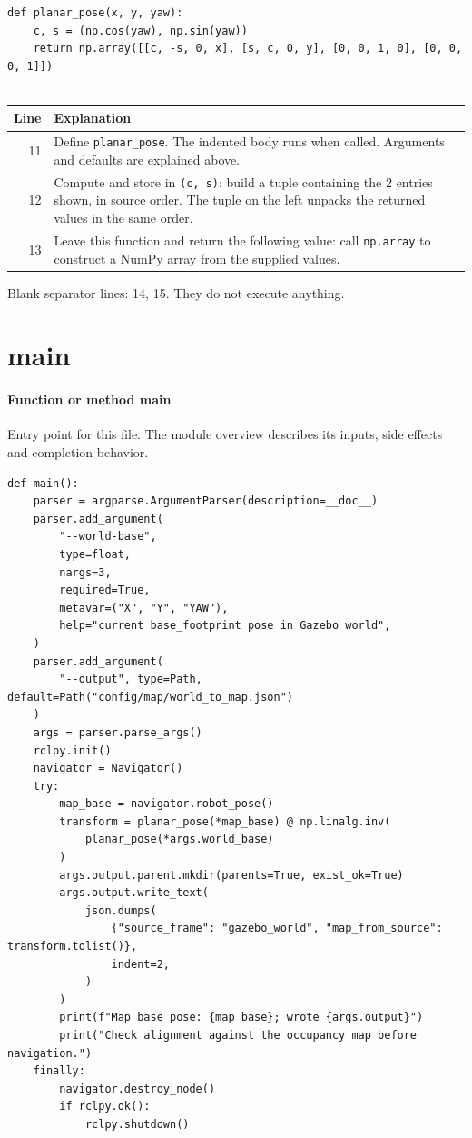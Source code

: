 \documentclass[11pt,a4paper]{book}
\begin{document}
\begin{lstlisting}[firstnumber=11]
def planar_pose(x, y, yaw):
    c, s = (np.cos(yaw), np.sin(yaw))
    return np.array([[c, -s, 0, x], [s, c, 0, y], [0, 0, 1, 0], [0, 0, 0, 1]])


\end{lstlisting}

\begin{longtable}{r p{}}

\textbf{Line} & \textbf{Explanation} \\ \hline \endhead

11 & Define \texttt{planar\_pose}. The indented body runs when called. Arguments and defaults are explained above. \\

12 & Compute and store in \texttt{(c, s)}: build a tuple containing the 2 entries shown, in source order. The tuple on the left unpacks the returned values in the same order. \\

13 & Leave this function and return the following value: call \texttt{np.array} to construct a NumPy array from the supplied values. \\

\end{longtable}

Blank separator lines: 14, 15. They do not execute anything.

\section{main}

\paragraph{Function or method main}
Entry point for this file. The module overview describes its inputs, side effects and completion behavior.


\begin{lstlisting}[firstnumber=16]
def main():
    parser = argparse.ArgumentParser(description=__doc__)
    parser.add_argument(
        "--world-base",
        type=float,
        nargs=3,
        required=True,
        metavar=("X", "Y", "YAW"),
        help="current base_footprint pose in Gazebo world",
    )
    parser.add_argument(
        "--output", type=Path, default=Path("config/map/world_to_map.json")
    )
    args = parser.parse_args()
    rclpy.init()
    navigator = Navigator()
    try:
        map_base = navigator.robot_pose()
        transform = planar_pose(*map_base) @ np.linalg.inv(
            planar_pose(*args.world_base)
        )
        args.output.parent.mkdir(parents=True, exist_ok=True)
        args.output.write_text(
            json.dumps(
                {"source_frame": "gazebo_world", "map_from_source": transform.tolist()},
                indent=2,
            )
        )
        print(f"Map base pose: {map_base}; wrote {args.output}")
        print("Check alignment against the occupancy map before navigation.")
    finally:
        navigator.destroy_node()
        if rclpy.ok():
            rclpy.shutdown()


\end{lstlisting}
\end{document}
